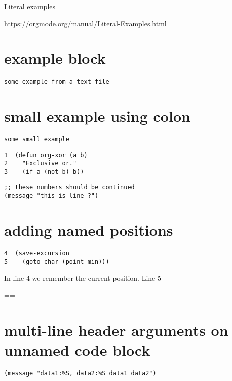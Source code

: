\documentclass[11pt]{article}
\author{Bartev Vartanian}
\date{\today}
\title{}
\begin{document}
\tableofcontents

Literal examples

\url{https://orgmode.org/manual/Literal-Examples.html}


\section{example block}
\label{sec:org48e3d08}

\begin{verbatim}
some example from a text file
\end{verbatim}

\section{small example using colon}
\label{sec:orga68e692}

\begin{verbatim}
some small example 
\end{verbatim}


\begin{verbatim}
1  (defun org-xor (a b)
2    "Exclusive or."
3    (if a (not b) b))
\end{verbatim}

\begin{verbatim}
;; these numbers should be continued
(message "this is line ?")
\end{verbatim}

\section{adding named positions}
\label{sec:org2558911}

\begin{verbatim}
4  (save-excursion
5    (goto-char (point-min)))
\end{verbatim}

In line 4 we remember the current position. Line 5


==

\section{multi-line header arguments on unnamed code block}
\label{sec:org0cf53e7}

\begin{verbatim}
(message "data1:%S, data2:%S data1 data2")
\end{verbatim}
\end{document}
